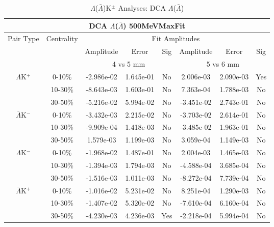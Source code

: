 \documentclass[../AnalysisNoteJBuxton.tex]{subfiles}
\begin{document}
\begin{table}
 \centering
 \begin{tabular}{|c|c|c|c|c||c|c|c|}
  \multicolumn{8}{c}{DCA $\Lambda$($\bar{\Lambda}$) 500MeVMaxFit} \\
  \hline
  \multirow{3}{*}{Pair Type} & \multirow{3}{*}{Centrality} & \multicolumn{6}{c|}{Fit Amplitudes} \\
  \cline{3-8}
   & & Amplitude & Error & Sig & Amplitude & Error & Sig \\  
  \cline{3-8}
   & & \multicolumn{3}{c||}{4 vs 5 mm} & \multicolumn{3}{c|}{5 vs 6 mm} \\  
  \hline
  \multirow{3}{*}{$\Lambda$K$^{+}$}
   &  0-10\% & -2.986e-02 & 1.645e-01 & No & 2.006e-03 & 2.090e-03 & Yes \\
   & 10-30\% & -8.643e-03 & 1.603e-01 & No & 7.363e-04 & 1.788e-03 & No \\
   & 30-50\% & -5.216e-02 & 5.994e-02 & No & -3.451e-02 & 2.743e-01 & No \\
  \hline
  \multirow{3}{*}{$\bar{\Lambda}$K$^{-}$}
   &  0-10\% & -3.432e-03 & 2.215e-02 & No & -3.703e-02 & 2.614e-01 & No \\
   & 10-30\% & -9.909e-04 & 1.418e-03 & No & -3.485e-02 & 1.963e-01 & No \\
   & 30-50\% & 1.579e-03 & 1.199e-03 & No & 3.059e-04 & 1.149e-03 & No \\
  \hline \hline
  \multirow{3}{*}{$\Lambda$K$^{-}$}
   &  0-10\% & -1.968e-02 & 1.487e-01 & No & 2.004e-03 & 1.465e-03 & No \\
   & 10-30\% & -1.394e-03 & 1.794e-03 & No & -4.588e-04 & 3.685e-04 & No \\
   & 30-50\% & -1.516e-03 & 1.011e-03 & No & -8.272e-04 & 7.739e-04 & No \\
  \hline
  \multirow{3}{*}{$\bar{\Lambda}$K$^{+}$}
   &  0-10\% & -1.016e-02 & 5.231e-02 & No & 8.251e-04 & 1.290e-03 & No \\
   & 10-30\% & -1.407e-02 & 5.320e-02 & No & -7.610e-04 & 6.160e-04 & No \\
   & 30-50\% & -4.230e-03 & 4.236e-03 & Yes & -2.218e-04 & 5.994e-04 & No \\
  \hline
 \end{tabular}
 \caption{$\Lambda$($\bar{\Lambda}$)K$^{\pm}$ Analyses: DCA $\Lambda$($\bar{\Lambda}$)}
 \label{tab:V0DcaLamKch_500MeVMaxFit}
\end{table}
\end{document}
